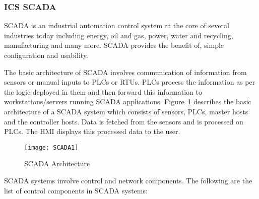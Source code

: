 \documentclass[article,msc=informatik,type=msc,colorback,accentcolor=tud9c]{tudthesis}
\begin{document}
	\vspace{5mm} 
	\subsubsection{ICS SCADA} \label{ICS SCADA}

	\ac{SCADA} is an industrial automation control system at the core of several industries today including energy, oil and gas, power, water and recycling, manufacturing and many more. \ac{SCADA} provides the benefit of, simple configuration and usability. 
	
	
	\vspace{5mm} 
	The basic architecture of \ac{SCADA} involves communication of information from sensors or manual inputs to \ac{PLC}s or \ac{RTU}s. \ac{PLC}s process the information as per the logic deployed in them and then forward this information to workstations/servers running \ac{SCADA} applications. Figure~\ref{f:SCADA Architecture} describes the basic architecture of a \ac{SCADA} system which consists of sensors, \ac{PLC}s, master hosts and the controller hosts. Data is fetched from the sensors and is processed on \ac{PLC}s. The \ac{HMI} displays this processed data to the user. 

	 \begin{figure}[ht]
	 	
        \centering
        \texttt{[image: SCADA1]}
        \caption[SCADA Architecture]{\label{f:SCADA Architecture}SCADA Architecture }
        \end{figure}


	\vspace{3mm}
	\ac{SCADA} systems involve control and network components. The following are the list of control components in \ac{SCADA} systems:
\end{document}
